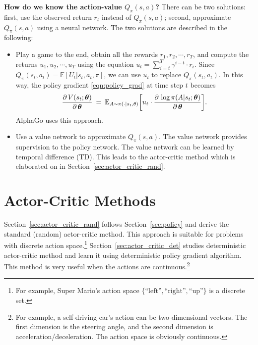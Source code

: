 \documentclass[11pt]{article}
\numberwithin{equation}{section}
\def\EB{{\mathbb E}}
\def\tha{\mbox{\boldmath$\theta$\unboldmath}}
\begin{document}
\textbf{How do we know the action-value $Q_\pi  (s, a) $?}
There can be two solutions: first, use the observed return $r_t$ instead of $Q_\pi  (s, a) $; second, approximate $Q_\pi  (s, a) $ using a neural network.
The two solutions are described in the following:
\begin{itemize}
\item
    Play a game to the end, obtain all the rewards $r_1, r_2, \cdots , r_T$, and compute the returns $u_1, u_2, \cdots , u_T$ using the equation $u_t = \sum_{i=t}^T \gamma^{i-t} \cdot r_i$.
    Since $Q_\pi  (s_t, a_t) = \EB [U_t | s_t, a_t , \pi ]$, we can use $u_t$ to replace $Q_\pi  (s_t, a_t) $.
    In this way, the policy gradient \eqref{eqn:policy_grad} at time step $t$ becomes
    \begin{equation*}
        \frac{\partial \, V (s_t ; \tha )}{\partial \, \tha }
        \: = \: \EB_{A \sim \pi (\cdot | s_t , \mathbf{\theta} )} \bigg[  u_t  \cdot \frac{\partial \,  \log \pi (A | s_t; \tha )  }{\partial \, \tha }  \bigg] .
    \end{equation*}
    AlphaGo \cite{silver2016mastering} uses this approach.
\item
    Use a value network to approximate $Q_\pi  (s, a) $.
    The value network provides supervision to the policy network.
    The value network can be learned by temporal difference (TD).
    This leads to the actor-critic method which is elaborated on in Section~\ref{sec:actor_critic_rand}.
\end{itemize}




\section{Actor-Critic Methods}  \label{sec:actor_critic}

Section~\ref{sec:actor_critic_rand} follows Section~\ref{sec:policy} and derive the standard (random) actor-critic method.
This approach is suitable for problems with discrete action space.\footnote{For example, Super Mario's action space $\{\textrm{``left''}, \textrm{``right''}, \textrm{``up''} \}$ is a discrete set.}
Section~\ref{sec:actor_critic_det} studies deterministic actor-critic method and learn it using deterministic policy gradient algorithm.
This method is very useful when the actions are continuous.\footnote{For example, a self-driving car's action can be two-dimensional vectors. The first dimension is the steering angle, and the second dimension is acceleration/deceleration. The action space is obviously continuous.}
\end{document}
